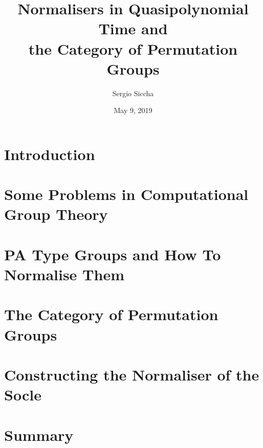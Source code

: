 \documentclass[handout]{beamer}
\title{Normalisers in Quasipolynomial Time and \\
the Category of Permutation Groups}
\date{May 9, 2019}
\author{Sergio Siccha}
\institute{Lehrstuhl B f\"ur Mathematik, RWTH Aachen}
\theoremstyle{plain}
\theoremstyle{definition}
\begin{document}
\maketitle
\section{Introduction}


\section{Some Problems in Computational Group Theory}


\section{PA Type Groups and How To Normalise Them}


\section{The Category of Permutation Groups}


\section{Constructing the Normaliser of the Socle}


\section{Summary}

\end{document}
